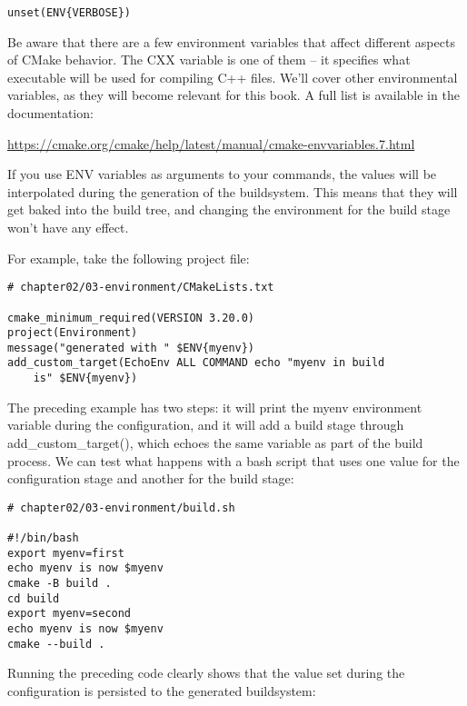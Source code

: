 \begin{lstlisting}[style=styleCMake]
unset(ENV{VERBOSE})
\end{lstlisting}

Be aware that there are a few environment variables that affect different aspects of CMake behavior. The CXX variable is one of them – it specifies what executable will be used for compiling C++ files. We'll cover other environmental variables, as they will become relevant for this book. A full list is available in the documentation:

\url{https://cmake.org/cmake/help/latest/manual/cmake-envvariables.7.html}

If you use ENV variables as arguments to your commands, the values will be interpolated during the generation of the buildsystem. This means that they will get baked into the build tree, and changing the environment for the build stage won't have any effect.

For example, take the following project file:

\begin{lstlisting}[style=styleCMake]
# chapter02/03-environment/CMakeLists.txt

cmake_minimum_required(VERSION 3.20.0)
project(Environment)
message("generated with " $ENV{myenv})
add_custom_target(EchoEnv ALL COMMAND echo "myenv in build
	is" $ENV{myenv})
\end{lstlisting}

The preceding example has two steps: it will print the myenv environment variable during the configuration, and it will add a build stage through add\_custom\_target(), which echoes the same variable as part of the build process. We can test what happens with a bash script that uses one value for the configuration stage and another for the build stage:

\begin{lstlisting}[style=stylePython]
# chapter02/03-environment/build.sh
	
#!/bin/bash
export myenv=first
echo myenv is now $myenv
cmake -B build .
cd build
export myenv=second
echo myenv is now $myenv
cmake --build .
\end{lstlisting}

Running the preceding code clearly shows that the value set during the configuration is persisted to the generated buildsystem:


